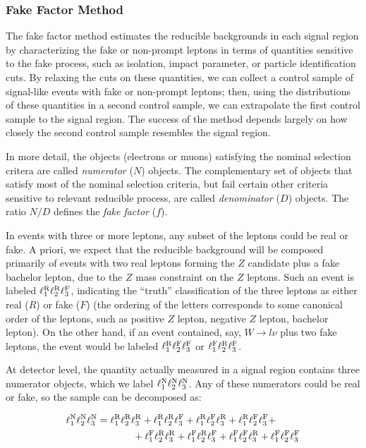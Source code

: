 \subsubsection{Fake Factor Method}\label{sec:model-independent-fake-factor-method}
The fake factor method estimates the reducible backgrounds in each signal region by characterizing the fake or non-prompt leptons in terms of quantities sensitive to the fake process, such as isolation, impact parameter, or particle identification cuts. By relaxing the cuts on these quantities, we can collect a control sample of signal-like events with fake or non-prompt leptons; then, using the distributions of these quantities in a second control sample, we can extrapolate the first control sample to the signal region. The success of the method depends largely on how closely the second control sample resembles the signal region. 

In more detail, the objects (electrons or muons) satisfying the nominal selection critera are called \emph{numerator} ($N$) objects. The complementary set of objects that satisfy most of the nominal selection criteria, but fail certain other criteria sensitive to relevant reducible process, are called \emph{denominator} ($D$) objects. The ratio $N/D$ defines the \emph{fake factor} ($f$). 

In events with three or more leptons, any subset of the leptons could be real or fake. A priori, we expect that the reducible background will be composed primarily of events with two real leptons forming the $Z$ candidate plus a fake bachelor lepton, due to the $Z$ mass constraint on the $Z$ leptons. Such an event is labeled $\ell_{1}^{\mathrm{R}}\ell_{2}^{\mathrm{R}}\ell_{3}^{\mathrm{F}}$, indicating the ``truth'' classification of the three leptons as either real ($R$) or fake ($F$) (the ordering of the letters corresponds to some canonical order of the leptons, such as positive $Z$ lepton, negative $Z$ lepton, bachelor lepton). On the other hand, if an event contained, say, $W\rightarrow l\nu$ plus two fake leptons, the event would be labeled $\ell_{1}^{\mathrm{R}}\ell_{2}^{\mathrm{F}}\ell_{3}^{\mathrm{F}}$ or $\ell_{1}^{\mathrm{F}}\ell_{2}^{\mathrm{R}}\ell_{3}^{\mathrm{F}}$. 

At detector level, the quantity actually measured in a signal region contains three numerator objects, which we label $\ell_{1}^{\mathrm{N}}\ell_{2}^{\mathrm{N}}\ell_{3}^{\mathrm{N}}$. Any of these numerators could be real or fake, so the sample can be decomposed as:

\begin{align}
	\ell_{1}^{\mathrm{N}}\ell_{2}^{\mathrm{N}}\ell_{3}^{\mathrm{N}} & = \ell_{1}^{\mathrm{R}}\ell_{2}^{\mathrm{R}}\ell_{3}^{\mathrm{R}} + \ell_{1}^{\mathrm{R}}\ell_{2}^{\mathrm{R}}\ell_{3}^{\mathrm{F}} + \ell_{1}^{\mathrm{R}}\ell_{2}^{\mathrm{F}}\ell_{3}^{\mathrm{R}} + \ell_{1}^{\mathrm{R}}\ell_{2}^{\mathrm{F}}\ell_{3}^{\mathrm{F}} +\\
	&  \hspace{0.5in} + \ell_{1}^{\mathrm{F}}\ell_{2}^{\mathrm{R}}\ell_{3}^{\mathrm{R}} + \ell_{1}^{\mathrm{F}}\ell_{2}^{\mathrm{R}}\ell_{3}^{\mathrm{F}} + \ell_{1}^{\mathrm{F}}\ell_{2}^{\mathrm{F}}\ell_{3}^{\mathrm{R}} + \ell_{1}^{\mathrm{F}}\ell_{2}^{\mathrm{F}}\ell_{3}^{\mathrm{F}}
\end{align}

